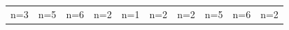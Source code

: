 \documentclass[letterpaper]{article} %
\begin{document}
\begin{figure}[!htbp]
\centering
\footnotesize 
\begin{tabular}{cccccccccc}
\multicolumn{1}{c}{n=3} \hspace{-11pt} &  
\multicolumn{1}{c}{n=5} \hspace{-11pt} & 
\multicolumn{1}{c}{n=6} \hspace{-11pt} & 
\multicolumn{1}{c}{n=2} \hspace{-11pt} & 
\multicolumn{1}{c}{n=1} \hspace{-11pt} & 
\multicolumn{1}{c}{n=2} \hspace{-11pt} & 
\multicolumn{1}{c}{n=2} \hspace{-11pt} &  
\multicolumn{1}{c}{n=5} \hspace{-11pt} & 
\multicolumn{1}{c}{n=6} \hspace{-11pt} & 
\multicolumn{1}{c}{n=2} \\ 


\end{tabular}
\end{figure}
\end{document}
